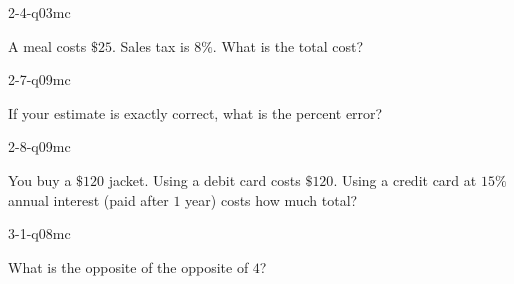 \begin{practiceQuestion}{2-4-q03}{mc}
\begin{questionText}
A meal costs $\$25$. Sales tax is $8\%$. What is the total cost?
\end{questionText}
\end{practiceQuestion}

\begin{practiceQuestion}{2-7-q09}{mc}
\begin{questionText}
If your estimate is exactly correct, what is the percent error?
\end{questionText}
\end{practiceQuestion}

\begin{practiceQuestion}{2-8-q09}{mc}
\begin{questionText}
You buy a $\$120$ jacket. Using a debit card costs $\$120$. Using a credit card at $15\%$ annual interest (paid after $1$ year) costs how much total?
\end{questionText}
\end{practiceQuestion}

\begin{practiceQuestion}{3-1-q08}{mc}
\begin{questionText}
What is the opposite of the opposite of $4$?
\end{questionText}
\end{practiceQuestion}

